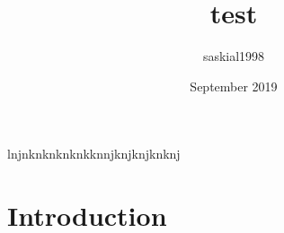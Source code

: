 \documentclass{article}
\title{test}
\author{saskial1998 }
\date{September 2019}
\begin{document}
lnjnknknknknkknnjknjknjknknj
\maketitle

\section{Introduction}
\end{document}

